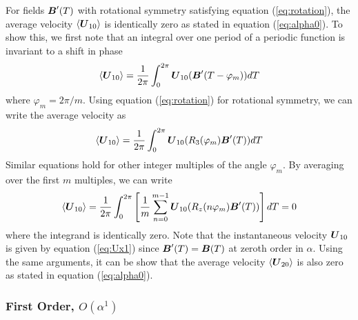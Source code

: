 \begin{appendices}
For fields $\boldsymbol{B}'(T)$ with rotational symmetry satisfying equation (\ref{eq:rotation}), the average velocity $\langle\boldsymbol{U}_{10}\rangle$ is identically zero as stated in equation (\ref{eq:alpha0}). To show this, we first note that an integral over one period of a periodic function is invariant to a shift in phase 
\begin{equation}
    \langle\boldsymbol{U}_{10}\rangle = \frac{1}{2\pi}\int_0^{2\pi} \boldsymbol{U}_{10}(\boldsymbol{B}'(T-\varphi_m)) dT
\end{equation}
where $\varphi_m=2\pi/m$. Using equation (\ref{eq:rotation}) for rotational symmetry, we can write the average velocity as 
\begin{equation}
    \langle\boldsymbol{U}_{10}\rangle = \frac{1}{2\pi}\int_0^{2\pi} \boldsymbol{U}_{10}(R_3(\varphi_m)\boldsymbol{B}'(T)) dT
\end{equation}
Similar equations hold for other integer multiples of the angle $\varphi_m$.  By averaging over the first $m$ multiples, we can write 
\begin{equation}
    \langle\boldsymbol{U}_{10}\rangle = \frac{1}{2\pi}\int_0^{2\pi} \left[\frac{1}{m} \sum_{n=0}^{m-1} \boldsymbol{U}_{10}(R_z(n \varphi_m)\boldsymbol{B}'(T)) \right] dT = 0 \label{eq:trick}
\end{equation}
where the integrand is identically zero. Note that the instantaneous velocity $\boldsymbol{U}_{10}$ is given by equation (\ref{eq:Ux1}) since $\boldsymbol{B}'(T)=\boldsymbol{B}(T)$ at zeroth order in $\alpha$. Using the same arguments, it can be show that the average velocity $\langle\boldsymbol{U}_{20}\rangle$ is also zero as stated in equation (\ref{eq:alpha0}).


\subsubsection{First Order, $O(\alpha^1)$}


\end{appendices}
